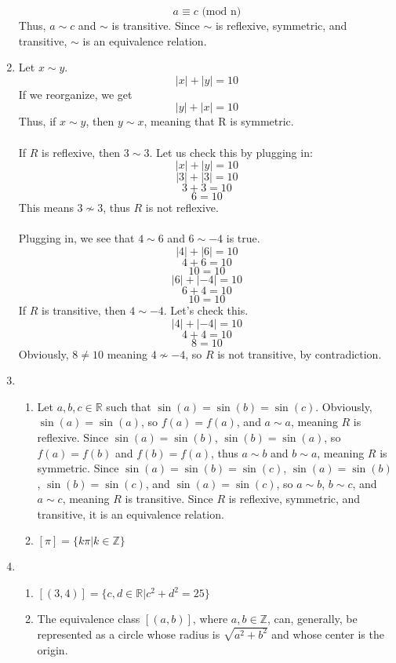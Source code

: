 \documentclass{article}
\begin{document}
\begin{enumerate}[label=\textbf{\arabic*}.]
    \[a\equiv c\text{ (mod n)}\]
    Thus, $a\sim{c}$ and $\sim$ is transitive. Since $\sim$ is reflexive, symmetric, and transitive, $\sim$ is an equivalence relation.
    \item Let $x\sim y$.
    \[|x|+|y|=10\]
    If we reorganize, we get
    \[|y|+|x|=10\]
    Thus, if $x\sim y$, then $y\sim x$, meaning that R is symmetric.\\\\
    If $R$ is reflexive, then $3\sim{3}$. Let us check this by plugging in:
    \[|x|+|y|=10\]
    \[|3|+|3|=10\]
    \[3+3=10\]
    \[6=10\]
    This means $3\not\sim{3}$, thus $R$ is not reflexive.\\\\
    Plugging in, we see that $4\sim{6}$ and $6\sim{-4}$  is true.
    \[|4|+|6|=10\]
    \[4+6=10\]
    \[10=10\]
    \[|6|+|-4|=10\]
    \[6+4=10\]
    \[10=10\]
    If $R$ is transitive, then $4\sim{-4}$. Let's check this.
    \[|4|+|-4|=10\]
    \[4+4=10\]
    \[8=10\]
    Obviously, $8\neq 10$ meaning $4\not\sim{-4}$, so $R$ is not transitive, by contradiction.
    \item 
        \begin{enumerate}[label=\textbf{\alph*}.]
                \item Let $a,b,c\in\mathbb{R}$ such that $\sin(a)=\sin(b)=\sin(c)$. Obviously, $\sin(a)=\sin(a)$, so $f(a)=f(a)$, and $a\sim{a}$, meaning $R$ is reflexive. Since $\sin(a)=\sin(b)$, $\sin(b)=\sin(a)$, so $f(a)=f(b)$ and $f(b)=f(a)$, thus $a\sim{b}$ and $b\sim{a}$, meaning $R$ is symmetric. Since $\sin(a)=\sin(b)=\sin(c)$, $\sin(a)=\sin(b)$, $\sin(b)=\sin(c)$, and $\sin(a)=\sin(c)$, so $a\sim{b}$, $b\sim{c}$, and $a\sim{c}$, meaning $R$ is transitive. Since $R$ is reflexive, symmetric, and transitive, it is an equivalence relation. 
            \item $[\pi]=\{k\pi|k\in\mathbb{Z}\}$ 
        \end{enumerate}
    \item 
        \begin{enumerate}[label=\textbf{\alph*}.]
            \item $[(3,4)]=\{c,d\in\mathbb{R}|c^2+d^2=25\}$
            \item The equivalence class $[(a,b)]$, where $a,b\in\mathbb{Z}$, can, generally, be represented as a circle whose radius is $\sqrt{a^2+b^2}$ and whose center is the origin.
        \end{enumerate}
\end{enumerate}
\end{document}
